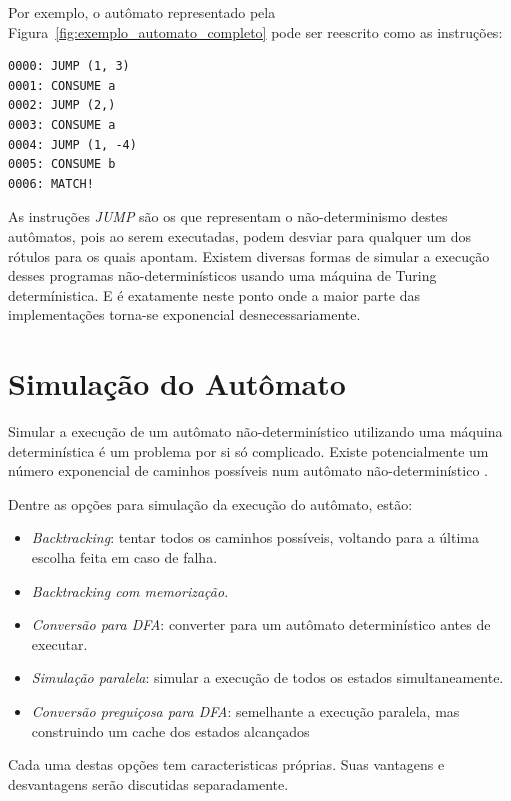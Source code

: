 \documentclass[a4paper,12pt,oneside,onecolumn]{uerj}
\begin{document}
Por exemplo, o autômato representado pela Figura~\ref{fig:exemplo_automato_completo} pode ser reescrito como as instruções:

\nopagebreak 
\begin{verbatim}
0000: JUMP (1, 3)
0001: CONSUME a
0002: JUMP (2,)
0003: CONSUME a
0004: JUMP (1, -4)
0005: CONSUME b
0006: MATCH!
\end{verbatim}

As instruções \emph{JUMP} são os que representam o não-determinismo destes autômatos, pois ao serem executadas, podem desviar para qualquer um dos rótulos para os quais apontam. Existem diversas formas de simular a execução desses programas não-determinísticos usando uma máquina de Turing determínistica. E é exatamente neste ponto onde a maior parte das implementações torna-se exponencial desnecessariamente.

\section{Simulação do Autômato}\label{sec:simulacao}

Simular a execução de um autômato não-determinístico utilizando uma máquina determinística é um problema por si só complicado. Existe potencialmente um número exponencial de caminhos possíveis num autômato não-determinístico \cite{bib:Rabin59}.

Dentre as opções para simulação da execução do autômato, estão:

\begin{itemize}
    \item \emph{Backtracking}: tentar todos os caminhos possíveis, voltando para a última escolha feita em caso de falha.
    \item \emph{Backtracking com memorização}.
    \item \emph{Conversão para DFA}: converter para um autômato determinístico antes de executar.
    \item \emph{Simulação paralela}: simular a execução de todos os estados simultaneamente.
	\item \emph{Conversão preguiçosa para DFA}: semelhante a execução paralela, mas construindo um cache dos estados alcançados
\end{itemize}

Cada uma destas opções tem caracteristicas próprias. Suas vantagens e desvantagens serão discutidas separadamente.
\end{document}
